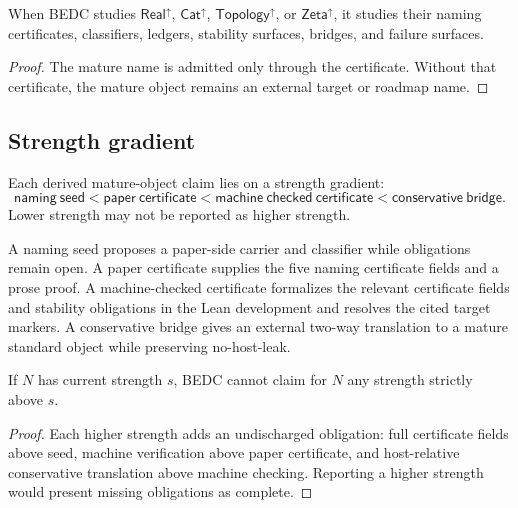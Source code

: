 \begin{corollary}
\label{cor:philosophy-programme-researches-certificates}
When BEDC studies \(\mathsf{Real}^{\uparrow}\),
\(\mathsf{Cat}^{\uparrow}\), \(\mathsf{Topology}^{\uparrow}\), or
\(\mathsf{Zeta}^{\uparrow}\), it studies their naming certificates,
classifiers, ledgers, stability surfaces, bridges, and failure
surfaces.
\end{corollary}
\begin{proof}
The mature name is admitted only through the certificate. Without that
certificate, the mature object remains an external target or roadmap
name.
\end{proof}

\subsection{Strength gradient}
\label{subsec:philosophy-programme-strength-gradient}

\begin{definition}
\label{def:philosophy-programme-research-strength}
Each derived mature-object claim lies on a strength gradient:
$$
\mathsf{naming\ seed}
< \mathsf{paper\ certificate}
< \mathsf{machine\ checked\ certificate}
< \mathsf{conservative\ bridge}.
$$
Lower strength may not be reported as higher strength.
\end{definition}

\begin{definition}
\label{def:philosophy-programme-four-strengths}
A naming seed proposes a paper-side carrier and classifier while
obligations remain open. A paper certificate supplies the five naming
certificate fields and a prose proof. A machine-checked certificate
formalizes the relevant certificate fields and stability obligations in
the Lean development and resolves the cited target markers. A
conservative bridge gives an external two-way translation to a mature
standard object while preserving no-host-leak.
\end{definition}

\begin{theorem}
\label{thm:philosophy-programme-no-strength-inflation}
If \(N\) has current strength \(s\), BEDC cannot claim for \(N\) any
strength strictly above \(s\).
\end{theorem}
\begin{proof}
Each higher strength adds an undischarged obligation: full certificate
fields above seed, machine verification above paper certificate, and
host-relative conservative translation above machine checking.
Reporting a higher strength would present missing obligations as
complete.
\end{proof}

